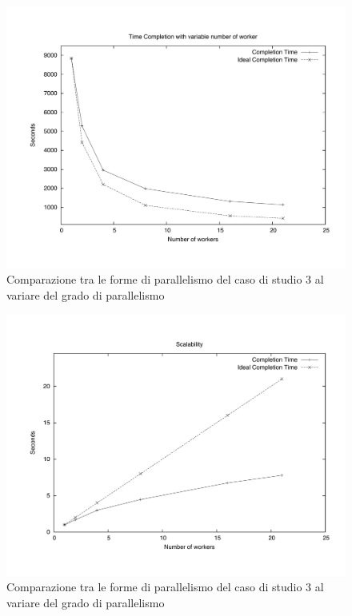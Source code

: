 \begin{figure}[th]
	\centerline{
		\mbox{\includegraphics[scale=0.45]{HadoopTest/PsFiles/NTime.pdf}}
	}
	\caption{Comparazione tra le forme di parallelismo del caso di studio 3 al variare del grado di parallelismo} 
\end{figure}

\begin{figure}[th]
	\centerline{
		\mbox{\includegraphics[scale=0.45]{HadoopTest/PsFiles/NScal.pdf}}
	}
	\caption{Comparazione tra le forme di parallelismo del caso di studio 3 al variare del grado di parallelismo} 
\end{figure}
